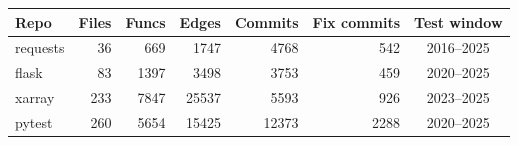 \begin{tabular}{lrrrrrc}
\toprule
Repo & Files & Funcs & Edges & Commits & Fix commits & Test window \\
\midrule
requests & 36 & 669 & 1747 & 4768 & 542 & 2016--2025 \\
flask & 83 & 1397 & 3498 & 3753 & 459 & 2020--2025 \\
xarray & 233 & 7847 & 25537 & 5593 & 926 & 2023--2025 \\
pytest & 260 & 5654 & 15425 & 12373 & 2288 & 2020--2025 \\
\bottomrule
\end{tabular}
